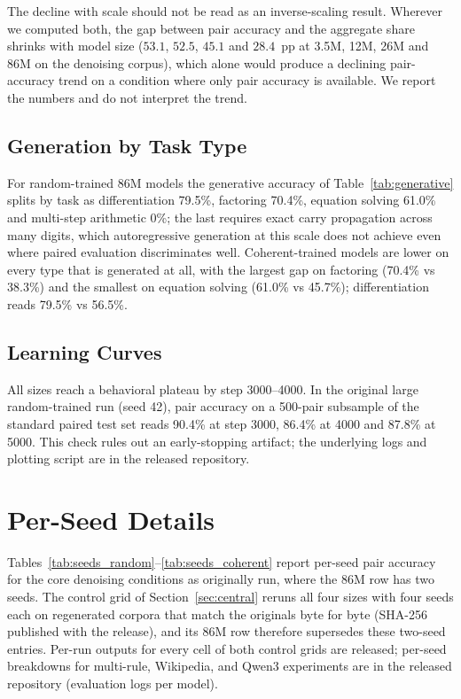 \documentclass{article}
\begin{document}
The decline with scale should not be read as an inverse-scaling result. Wherever we computed both, the gap between pair accuracy and the aggregate share shrinks with model size ($53.1$, $52.5$, $45.1$ and $28.4$~pp at 3.5M, 12M, 26M and 86M on the denoising corpus), which alone would produce a declining pair-accuracy trend on a condition where only pair accuracy is available. We report the numbers and do not interpret the trend.

\subsection{Generation by Task Type}
\label{app:gentask}

For random-trained 86M models the generative accuracy of Table~\ref{tab:generative} splits by task as differentiation 79.5\%, factoring 70.4\%, equation solving 61.0\% and multi-step arithmetic 0\%; the last requires exact carry propagation across many digits, which autoregressive generation at this scale does not achieve even where paired evaluation discriminates well. Coherent-trained models are lower on every type that is generated at all, with the largest gap on factoring (70.4\% vs 38.3\%) and the smallest on equation solving (61.0\% vs 45.7\%); differentiation reads 79.5\% vs 56.5\%.

\subsection{Learning Curves}

All sizes reach a behavioral plateau by step 3000--4000. In the original large random-trained run (seed 42), pair accuracy on a 500-pair subsample of the standard paired test set reads 90.4\% at step 3000, 86.4\% at 4000 and 87.8\% at 5000. This check rules out an early-stopping artifact; the underlying logs and plotting script are in the released repository.

\section{Per-Seed Details}
\label{app:seeds}

Tables~\ref{tab:seeds_random}--\ref{tab:seeds_coherent} report per-seed pair accuracy for the core denoising conditions as originally run, where the 86M row has two seeds. The control grid of Section~\ref{sec:central} reruns all four sizes with four seeds each on regenerated corpora that match the originals byte for byte (SHA-256 published with the release), and its 86M row therefore supersedes these two-seed entries. Per-run outputs for every cell of both control grids are released; per-seed breakdowns for multi-rule, Wikipedia, and Qwen3 experiments are in the released repository (evaluation logs per model).
\end{document}
